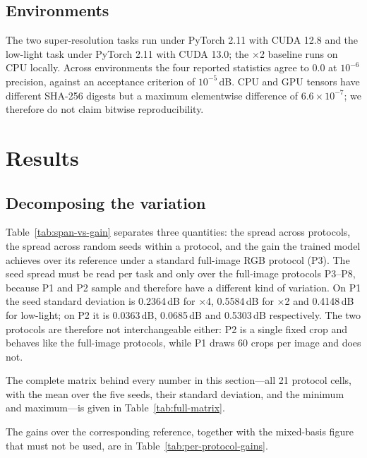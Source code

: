 \documentclass[10pt,twocolumn]{article}
\begin{document}
\subsection{Environments}

The two super-resolution tasks run under PyTorch 2.11 with CUDA 12.8 and the
low-light task under PyTorch 2.11 with CUDA 13.0; the $\times$2 baseline
runs on CPU locally. Across environments the four reported statistics agree
to $0.0$ at $10^{-6}$ precision, against an acceptance criterion of
$10^{-5}$\,dB. CPU and GPU tensors have different SHA-256 digests but a
maximum elementwise difference of $6.6\times10^{-7}$; we therefore do not
claim bitwise reproducibility.

\section{Results}

\subsection{Decomposing the variation}

Table~\ref{tab:span-vs-gain} separates three quantities: the spread across
protocols, the spread across random seeds within a protocol, and the gain the
trained model achieves over its reference under a standard full-image RGB
protocol (P3). The seed spread must be read per task and only over the
full-image protocols P3--P8, because P1 and P2 sample and therefore have a
different kind of variation. On P1 the seed standard deviation is
0.2364\,dB for $\times$4, 0.5584\,dB for $\times$2 and 0.4148\,dB for
low-light; on P2 it is 0.0363\,dB, 0.0685\,dB and 0.5303\,dB respectively.
The two protocols are therefore not interchangeable either: P2 is a single
fixed crop and behaves like the full-image protocols, while P1 draws 60
crops per image and does not.

The complete matrix behind every number in this section---all 21 protocol
cells, with the mean over the five seeds, their standard deviation, and the
minimum and maximum---is given in Table~\ref{tab:full-matrix}.

The gains over the corresponding reference, together with the mixed-basis
figure that must not be used, are in Table~\ref{tab:per-protocol-gains}.


\end{document}
